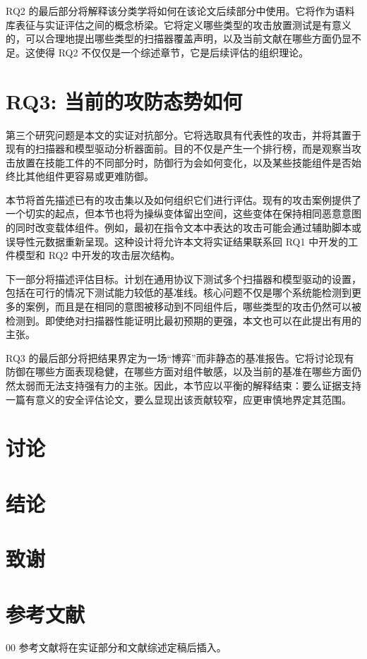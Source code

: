 \documentclass[conference]{IEEEtran}
\begin{document}
RQ2 的最后部分将解释该分类学将如何在该论文后续部分中使用。它将作为语料库表征与实证评估之间的概念桥梁。它将定义哪些类型的攻击放置测试是有意义的，可以合理地提出哪些类型的扫描器覆盖声明，以及当前文献在哪些方面仍显不足。这使得 RQ2 不仅仅是一个综述章节，它是后续评估的组织理论。

\section{RQ3: 当前的攻防态势如何}

第三个研究问题是本文的实证对抗部分。它将选取具有代表性的攻击，并将其置于现有的扫描器和模型驱动分析器面前。目的不仅是产生一个排行榜，而是观察当攻击放置在技能工件的不同部分时，防御行为会如何变化，以及某些技能组件是否始终比其他组件更容易或更难防御。

本节将首先描述已有的攻击集以及如何组织它们进行评估。现有的攻击案例提供了一个切实的起点，但本节也将为操纵变体留出空间，这些变体在保持相同恶意意图的同时改变载体组件。例如，最初在指令文本中表达的攻击可能会通过辅助脚本或误导性元数据重新呈现。这种设计将允许本文将实证结果联系回 RQ1 中开发的工件模型和 RQ2 中开发的攻击层次结构。

下一部分将描述评估目标。计划在通用协议下测试多个扫描器和模型驱动的设置，包括在可行的情况下测试能力较低的基准线。核心问题不仅是哪个系统能检测到更多的案例，而且是在相同的意图被移动到不同组件后，哪些类型的攻击仍然可以被检测到。即使绝对扫描器性能证明比最初预期的更强，本文也可以在此提出有用的主张。

RQ3 的最后部分将把结果界定为一场“博弈”而非静态的基准报告。它将讨论现有防御在哪些方面表现稳健，在哪些方面对组件敏感，以及当前的基准在哪些方面仍然太弱而无法支持强有力的主张。因此，本节应以平衡的解释结束：要么证据支持一篇有意义的安全评估论文，要么显现出该贡献较窄，应更审慎地界定其范围。

\section{讨论}

\section{结论}

\section*{致谢}


\section*{参考文献}

\begin{thebibliography}{00}
 参考文献将在实证部分和文献综述定稿后插入。
\end{thebibliography}
\end{document}
